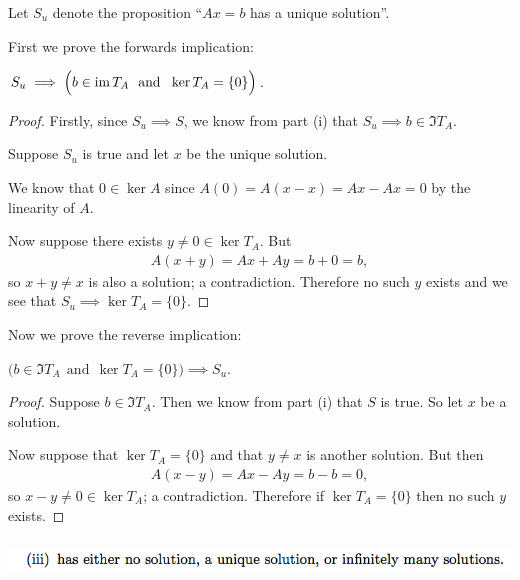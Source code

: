 \documentclass[12pt]{article}
\begin{document}
Let $S_u$ denote the proposition ``$Ax = b$ has a unique solution''.

First we prove the forwards implication:

\begin{claim*}
  $S_u \implies \Big(b \in \operatorname{\text{im}} T_A ~~\text{and}~~ \ker T_A = \{0\}\Big)$.
\end{claim*}

\begin{proof}
Firstly, since $S_u \implies S$, we know from part (i) that
$S_u \implies b \in \Im T_A$.

Suppose $S_u$ is true and let $x$ be the unique solution.

We know that $0 \in \ker A$ since $A(0) = A(x - x) = Ax - Ax = 0$ by the
linearity of $A$.

Now suppose there exists $y \neq 0 \in \ker T_A$. But
\begin{align*}
A(x + y) = Ax + Ay = b + 0 = b,
\end{align*}
so $x + y \neq x$ is also a solution; a contradiction. Therefore no such $y$
exists and we see that $S_u \implies \ker T_A = \{0\}$.
\end{proof}

Now we prove the reverse implication:

\begin{claim*}
  $\Big(b \in \Im T_A ~~\text{and}~~ \ker T_A = \{0\}\Big) \implies S_u$.
\end{claim*}

\begin{proof}
  Suppose $b \in \Im T_A$. Then we know from part (i) that $S$ is true. So let
  $x$ be a solution.

Now suppose that $\ker T_A = \{0\}$ and that $y \neq x$ is another solution. But then
\begin{align*}
  A(x - y) = Ax - Ay = b - b = 0,
\end{align*}
so $x - y \neq 0 \in \ker T_A$; a contradiction. Therefore if $\ker T_A = \{0\}$
then no such $y$ exists.
\end{proof}

\subsubsection*{} %
\begin{mdframed}
\includegraphics[width=400pt]{img/oxford-prelims-2017-A-2-1-3.png}
\end{mdframed}
\end{document}
